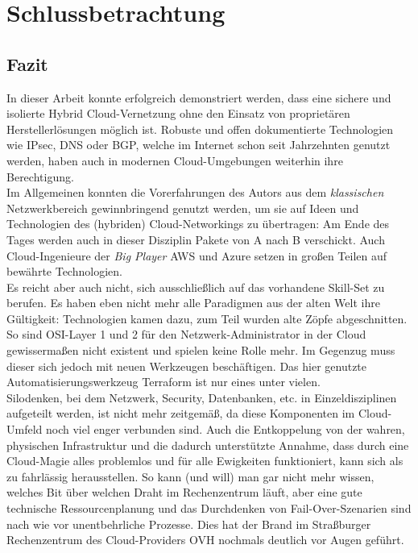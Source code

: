 \chapter{Schlussbetrachtung} \label{Fazit und Ausblick}
\section{Fazit}

In dieser Arbeit konnte erfolgreich demonstriert werden, dass eine sichere und isolierte Hybrid Cloud-Vernetzung ohne den Einsatz von proprietären Herstellerlösungen möglich ist. Robuste und offen dokumentierte Technologien wie IPsec, DNS oder BGP, welche im Internet schon seit Jahrzehnten genutzt werden, haben auch in \glqq modernen\grqq{} Cloud-Umgebungen weiterhin ihre Berechtigung.\\
Im Allgemeinen konnten die Vorerfahrungen des Autors aus dem \textit{klassischen} Netzwerkbereich gewinnbringend genutzt werden, um sie auf Ideen und Technologien des (hybriden) Cloud-Networkings zu übertragen: Am Ende des Tages werden auch in dieser Disziplin Pakete von A nach B verschickt. Auch Cloud-Ingenieure der \textit{Big Player} AWS und Azure setzen in großen Teilen auf bewährte Technologien.\\
Es reicht aber auch nicht, sich ausschließlich auf das vorhandene Skill-Set zu berufen. Es haben eben nicht mehr alle Paradigmen aus der \glqq alten Welt\grqq{} ihre Gültigkeit: Technologien kamen dazu, zum Teil wurden alte Zöpfe abgeschnitten. So sind OSI-Layer 1 und 2 für den Netzwerk-Administrator in der Cloud gewissermaßen nicht existent und spielen keine Rolle mehr. Im Gegenzug muss dieser sich jedoch mit neuen Werkzeugen beschäftigen. Das hier genutzte Automatisierungswerkzeug Terraform ist nur eines unter vielen.\\
Silodenken, bei dem Netzwerk, Security, Datenbanken, etc. in Einzeldisziplinen aufgeteilt werden, ist nicht mehr zeitgemäß, da diese Komponenten im Cloud-Umfeld noch viel enger verbunden sind. Auch die Entkoppelung von der \glqq wahren\grqq{}, physischen Infrastruktur und die dadurch unterstützte Annahme, dass durch eine \glqq Cloud-Magie\grqq{} alles problemlos und für alle Ewigkeiten funktioniert, kann sich als zu fahrlässig herausstellen. So kann (und will) man gar nicht mehr wissen, \glqq welches Bit über welchen Draht im Rechenzentrum läuft\grqq{}, aber eine gute technische Ressourcenplanung und das Durchdenken von Fail-Over-Szenarien sind nach wie vor unentbehrliche Prozesse. Dies hat der Brand im Straßburger Rechenzentrum des Cloud-Providers OVH nochmals deutlich vor Augen geführt\cite{ChristofKerkmann2021}.\\
